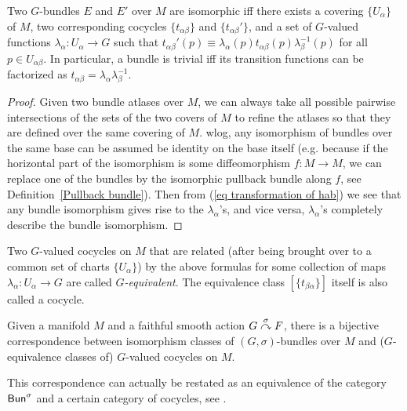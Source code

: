 \begin{thm}\label{bundle isomorphism thm}
Two $G$-bundles $E$ and $E'$ over $M$ are isomorphic iff there exists a covering $\{U_\alpha \}$ of $M$, two corresponding cocycles $\{t_{\alpha\beta}\}$ and $\{t_{\alpha\beta}'\}$, and a set of $G$-valued functions $\lambda_\alpha:U_\alpha\to G$ such that $t_{\alpha\beta}'(p)\equiv \lambda_\alpha (p) t_{\alpha\beta}(p) \lambda_\beta^{-1}(p)$ for all $p\in U_{\alpha\beta}$. In particular, a bundle is trivial iff its transition functions can be factorized as $t_{\alpha\beta}=\lambda_\alpha \lambda_\beta^{-1}$.
\end{thm}
\begin{proof}
Given two bundle atlases over $M$, we can always take all possible pairwise intersections of the sets of the two covers of $M$ to refine the atlases so that they are defined over the same covering of $M$. \gls{wlog}, any isomorphism of bundles over the same base can be assumed be identity on the base itself (e.g. because if the horizontal part of the isomorphism is some diffeomorphism $f:M\to M$, we can replace one of the bundles by the isomorphic pullback bundle along $f$, see Definition~\ref{Pullback bundle}). Then from (\ref{eq transformation of hab}) we see that any bundle isomorphism gives rise to the $\lambda_\alpha$'s, and vice versa, $\lambda_\alpha$'s completely describe the bundle isomorphism. 
\end{proof}
\begin{defn}
    Two $G$-valued cocycles on $M$ that are related (after being brought over to a common set of charts $\{U_\alpha\}$) by the above formulas for some collection of maps $\lambda_\alpha:U_\alpha\to G$ are called \emph{$G$-equivalent}. The equivalence class $[\{t_{\beta\alpha}\}]$ itself is also called a cocycle.
\end{defn}
\begin{cor}
    Given a manifold $M$ and a faithful smooth action $G\overset{\sigma}{\curvearrowright} F$, there is a bijective correspondence between isomorphism classes of $(G,\sigma)$-bundles over $M$ and ($G$-equivalence classes of) $G$-valued cocycles on $M$.
\end{cor}
This correspondence can actually be restated as an equivalence of the category $\mathsf{Bun}^\sigma$ and a certain category of cocycles, see \cite{Vakar}.

